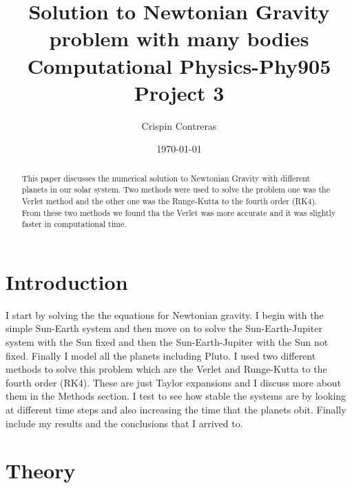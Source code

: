 \documentclass[11pt,a4wide]{article}
\begin{document}
\title{Solution to Newtonian Gravity problem with many bodies \break Computational Physics-Phy905 \break Project 3}
\author{Crispin Contreras}
\date{\today}
\maketitle


\begin{abstract}
This paper discusses the numerical solution to Newtonian Gravity with different planets in our solar system. Two methods were used to solve the problem one was the Verlet method and the other one was the Runge-Kutta to the fourth order (RK4). From these two methods we found tha the Verlet was more accurate and it was slightly faster in computational time. 
\end{abstract}



\section{Introduction}
I start by solving the the equations for Newtonian gravity. I begin with the simple Sun-Earth system and then move on to solve the Sun-Earth-Jupiter system with the Sun fixed and then the Sun-Earth-Jupiter with the Sun not fixed. Finally I model all the planets including Pluto. I used two different methods to solve this problem which are the Verlet and Runge-Kutta to the fourth order (RK4). These are just Taylor expansions and I discuss more about them in the Methods section. I test to see how stable the systems are by looking at different time steps and also increasing the time that the planets obit. Finally include my results and the conclusions that I arrived to. 

\section{Theory}
\end{document}
